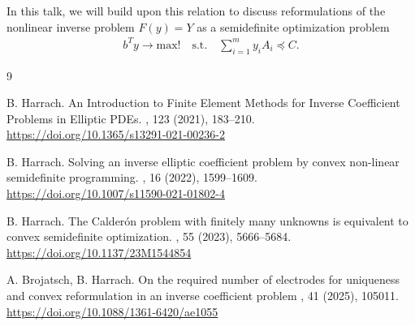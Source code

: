 \documentclass[11pt]{article}
\begin{document}
In this talk, we will build upon this relation to discuss reformulations of the nonlinear inverse problem $F(y)=Y$ as a semidefinite optimization problem \cite{Harrach2022, Harrach2023}
\begin{align*}
 b^T y \to \text{max!}
 \quad \text{s.t.} \quad  \sum_{i=1}^m y_i A_i \preceq C.
\end{align*}

%

\vspace{1em}

\begin{thebibliography}{9}

B. Harrach.
\newblock An Introduction to Finite Element Methods for Inverse Coefficient Problems in Elliptic PDEs.
, 123 (2021), 183--210. 
\newblock \href{https://doi.org/10.1365/s13291-021-00236-2}{https://doi.org/10.1365/s13291-021-00236-2}

B. Harrach.
\newblock Solving an inverse elliptic coefficient problem by convex non-linear semidefinite programming.
, 16 (2022), 1599--1609.
\newblock \href{https://doi.org/10.1007/s11590-021-01802-4}{https://doi.org/10.1007/s11590-021-01802-4}

B. Harrach.
\newblock The Calder\'on problem with finitely many unknowns is equivalent to convex semidefinite optimization.
, 55 (2023), 5666--5684.
\newblock \href{https://doi.org/10.1137/23M1544854}{https://doi.org/10.1137/23M1544854}

A. Brojatsch, B. Harrach.
\newblock On the required number of electrodes for uniqueness and convex reformulation in an inverse coefficient problem
, 41 (2025), 105011.
\newblock \href{https://doi.org/10.1088/1361-6420/ae1055}{https://doi.org/10.1088/1361-6420/ae1055}
\end{thebibliography}
\end{document}
